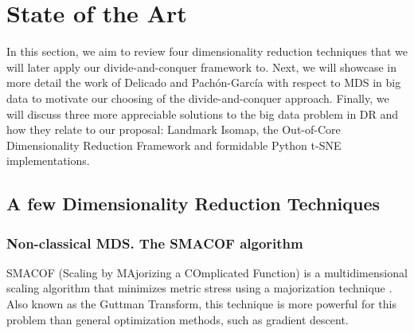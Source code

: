 \section{State of the Art}

In this section, we aim to review four dimensionality reduction techniques that we will later apply our divide-and-conquer framework to. Next, we will showcase in more detail the work of Delicado and Pachón-García with respect to MDS in big data to motivate our choosing of the divide-and-conquer approach. Finally, we will discuss three more appreciable solutions to the big data problem in DR and how they relate to our proposal: Landmark Isomap, the Out-of-Core Dimensionality Reduction Framework and formidable Python t-SNE implementations.

\subsection{A few Dimensionality Reduction Techniques}

\subsubsection{Non-classical MDS. The SMACOF algorithm}

SMACOF (Scaling by MAjorizing a COmplicated Function) is a multidimensional scaling algorithm that minimizes metric stress using a majorization technique \cite{borg1997modern}. Also known as the Guttman Transform, this technique is more powerful for this problem than general optimization methods, such as gradient descent.

